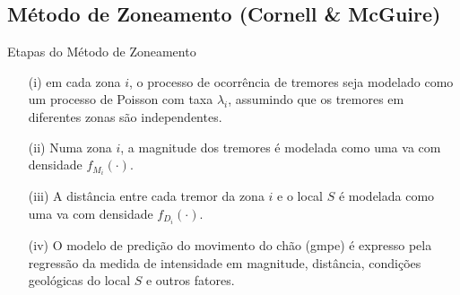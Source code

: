 \documentclass[ucs,8pt]{beamer}
\begin{document}
\subsection{Método de Zoneamento (Cornell \& McGuire)}

\begin{frame}{Etapas do Método de Zoneamento}

	\begin{itemize}[<+->]
		\item[(i)] em cada zona $i$, o processo de ocorrência de tremores seja 
		modelado como um processo de Poisson com taxa $\lambda_i$, assumindo que os tremores em diferentes zonas são
		independentes.
		\item[(ii)] Numa zona $i$, a magnitude dos tremores é modelada como uma \gls{va}
		com densidade $f_{M_i}(\cdot)$.
		\item[(iii)] A distância entre cada tremor da zona $i$ e o local $S$ é modelada como uma \gls{va}
		com densidade $f_{D_i}(\cdot)$.
		\item[(iv)] O modelo de predição do movimento do chão (\gls{gmpe}) é expresso pela regressão da medida de intensidade
		em magnitude, distância, condições geológicas do local $S$ e outros fatores.
	\end{itemize}

\end{frame}
\end{document}
